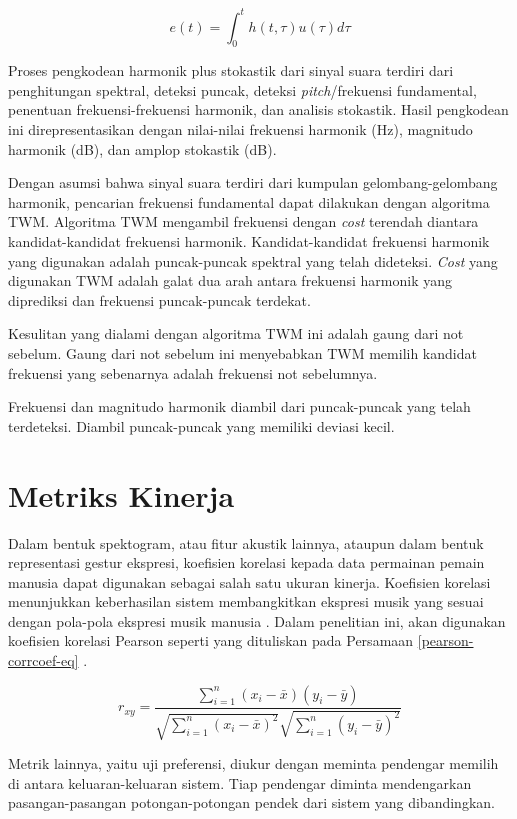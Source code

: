 \begin{equation}
e(t)=\int_0^t h(t,\tau)u(\tau)d\tau
\end{equation}

Proses pengkodean harmonik plus stokastik dari sinyal suara terdiri dari penghitungan spektral, deteksi puncak, deteksi \textit{pitch}/frekuensi fundamental, penentuan frekuensi-frekuensi harmonik, dan analisis stokastik. Hasil pengkodean ini direpresentasikan dengan nilai-nilai frekuensi harmonik (Hz), magnitudo harmonik (dB), dan amplop stokastik (dB). \parencite{serra1997sineplusnoise}

Dengan asumsi bahwa sinyal suara terdiri dari kumpulan gelombang-gelombang harmonik, pencarian frekuensi fundamental dapat dilakukan dengan algoritma TWM. Algoritma TWM mengambil frekuensi dengan \textit{cost} terendah diantara kandidat-kandidat frekuensi harmonik. Kandidat-kandidat frekuensi harmonik yang digunakan adalah puncak-puncak spektral yang telah dideteksi. \textit{Cost} yang digunakan TWM adalah galat dua arah antara frekuensi harmonik yang diprediksi dan frekuensi puncak-puncak terdekat. \parencite{beauchamp1994twm}

Kesulitan yang dialami dengan algoritma TWM ini adalah gaung dari not sebelum. Gaung dari not sebelum ini menyebabkan TWM memilih kandidat frekuensi yang sebenarnya adalah frekuensi not sebelumnya. \parencite{beauchamp1994twm}

Frekuensi dan magnitudo harmonik diambil dari puncak-puncak yang telah terdeteksi. Diambil puncak-puncak yang memiliki deviasi kecil. \parencite{sierra1990sms}

\section{Metriks Kinerja}

Dalam bentuk spektogram, atau fitur akustik lainnya, ataupun dalam bentuk representasi gestur ekspresi, koefisien korelasi kepada data permainan pemain manusia dapat digunakan sebagai salah satu ukuran kinerja. Koefisien korelasi menunjukkan keberhasilan sistem membangkitkan ekspresi musik yang sesuai dengan pola-pola ekspresi musik manusia \parencite{schubert2017test} \parencite{lindemann2007rpm}
\parencite{yu2017bowing}. Dalam penelitian ini, akan digunakan koefisien korelasi Pearson seperti yang dituliskan pada Persamaan \ref{pearson-corrcoef-eq} \parencite{pearson1895note}.


\begin{equation}
    r_{xy}=\dfrac{\sum^n_{i=1}(x_i-\bar{x})(y_i-\bar{y})}{\sqrt{\sum^n_{i=1}(x_i-\bar{x})^2}{\sqrt{\sum^n_{i=1}(y_i-\bar{y})^2}}}
\end{equation}\label{pearson-corrcoef-eq}

Metrik lainnya, yaitu uji preferensi, diukur dengan meminta pendengar memilih di antara keluaran-keluaran sistem. Tiap pendengar diminta mendengarkan pasangan-pasangan potongan-potongan pendek dari sistem yang dibandingkan. \parencite{bonada2017singing}
